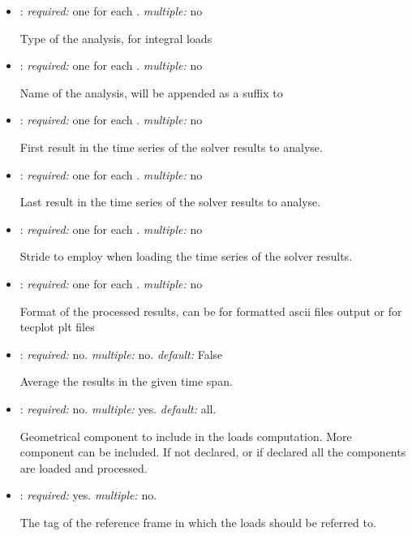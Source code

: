 \begin{itemize}
\item {}: \textit{required:} one for each . \textit{multiple:} no

Type of the analysis,  for integral loads

\item {}: \textit{required:} one for each . \textit{multiple:} no

Name of the analysis, will be appended as a suffix to 

\item {}: \textit{required:} one for each . \textit{multiple:} no

First result in the time series of the solver results to analyse.

\item {}: \textit{required:} one for each . \textit{multiple:} no

Last result in the time series of the solver results to analyse.

\item {}: \textit{required:} one for each . \textit{multiple:} no

Stride to employ when loading the time series of the solver results. 

\item {}: \textit{required:} one for each . \textit{multiple:} no

Format of the processed results, can be  for formatted ascii files output or  for tecplot plt files

\item {}: \textit{required:} no. \textit{multiple:} no. \textit{default:} False

Average the results in the given time span.

\item {}: \textit{required:} no. \textit{multiple:} yes. \textit{default:} all.

Geometrical component to include in the loads computation. More component can be included. If not declared, or if declared  all the components are loaded and processed. 

\item {}: \textit{required:} yes. \textit{multiple:} no.

The tag of the reference frame in which the loads should be referred to. 

\end{itemize}

